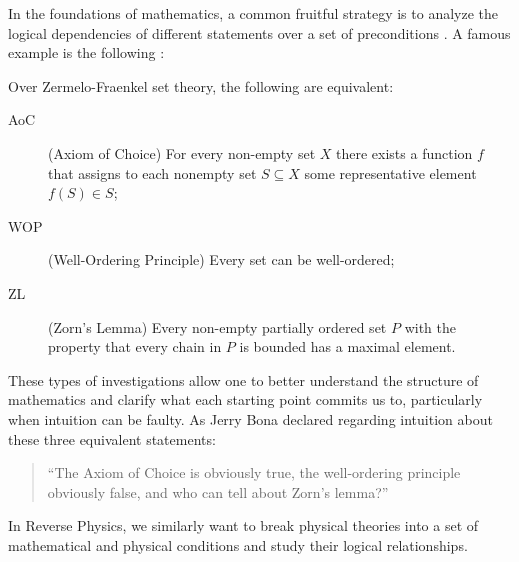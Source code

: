 \documentclass[entropy,article,submit,moreauthors]{Definitions/mdpi}
\begin{document}
In the foundations of mathematics, a common fruitful strategy is to analyze the logical dependencies of different statements over a set of preconditions \cite{Simpson2009,Stillwell2018}. A famous example is the following \cite{Pinter2014,Schechter1997}:
\begin{Theorem}
	Over Zermelo-Fraenkel set theory, the following are equivalent:
	\begin{description}
		\item[AoC] (Axiom of Choice) For every non-empty set $X$ there exists a function $f$ that assigns to each nonempty set $S \subseteq X$ some
		representative element $f ( S ) \in S$;
		\item [WOP] (Well-Ordering Principle) Every set can be well-ordered;
		\item [ZL] (Zorn's Lemma) Every non-empty partially ordered set $P$ with the property that every chain in $P$ is bounded has a maximal element.
	\end{description}
\end{Theorem}
These types of investigations allow one to better understand the structure of mathematics and clarify what each starting point commits us to, particularly when intuition can be faulty. As Jerry Bona declared \cite[p. 145]{Schechter1997} regarding intuition about these three equivalent statements:
\begin{quote}
	``The Axiom of Choice is obviously true, the well-ordering principle obviously false, and who can tell about Zorn's lemma?''
\end{quote}
In Reverse Physics, we similarly want to break physical theories into a set of mathematical and physical conditions and study their logical relationships.
\end{document}
